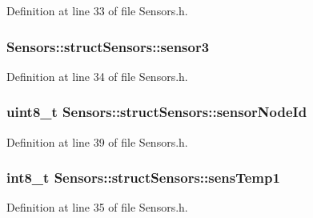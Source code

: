 Definition at line 33 of file Sensors.\+h.

\subsubsection[{\texorpdfstring{sensor3}{sensor3}}]{ Sensors\+::struct\+Sensors\+::sensor3}\hypertarget{struct_sensors_1_1struct_sensors_a83cf8dccb4cdd9793eccfe22bf700182}{}\label{struct_sensors_1_1struct_sensors_a83cf8dccb4cdd9793eccfe22bf700182}


Definition at line 34 of file Sensors.\+h.

\subsubsection[{\texorpdfstring{sensor\+Node\+Id}{sensorNodeId}}]{\setlength{\rightskip}{0pt plus 5cm}uint8\+\_\+t Sensors\+::struct\+Sensors\+::sensor\+Node\+Id}\hypertarget{struct_sensors_1_1struct_sensors_aab40fd3e3c8f0086b7b80d8cbb1e80cb}{}\label{struct_sensors_1_1struct_sensors_aab40fd3e3c8f0086b7b80d8cbb1e80cb}


Definition at line 39 of file Sensors.\+h.

\subsubsection[{\texorpdfstring{sens\+Temp1}{sensTemp1}}]{\setlength{\rightskip}{0pt plus 5cm}int8\+\_\+t Sensors\+::struct\+Sensors\+::sens\+Temp1}\hypertarget{struct_sensors_1_1struct_sensors_abed58bc62187a31307dfae2fb9303072}{}\label{struct_sensors_1_1struct_sensors_abed58bc62187a31307dfae2fb9303072}


Definition at line 35 of file Sensors.\+h.

